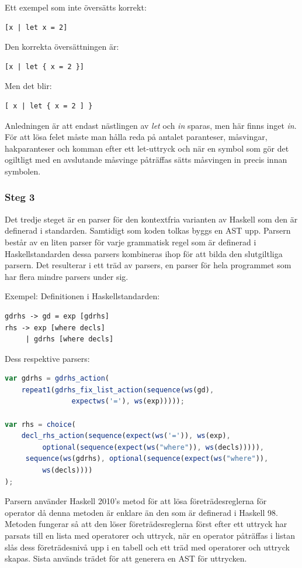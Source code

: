 Ett exempel som inte översätts korrekt:
\begin{lstlisting}
[x | let x = 2]
\end{lstlisting}
Den korrekta översättningen är:
\begin{lstlisting}
[x | let { x = 2 }]
\end{lstlisting}
Men det blir:
\begin{lstlisting}
[ x | let { x = 2 ] }
\end{lstlisting}
Anledningen är att endast nästlingen av \emph{let} och \emph{in} sparas, men här finns inget \emph{in}.
För att lösa felet måste man hålla reda på antalet paranteser, måsvingar, hakparanteser och komman efter ett let-uttryck och när en symbol som gör det ogiltligt 
med en avslutande måsvinge påträffas sätts måsvingen in precis innan symbolen.

\subsubsection{Steg 3}
Det tredje steget är en parser för den kontextfria varianten av Haskell som den är definerad i standarden. 
Samtidigt som koden tolkas byggs en AST upp. Parsern består av en liten parser för varje grammatisk regel som är definerad i Haskellstandarden 
dessa parsers kombineras ihop för att bilda den slutgiltliga parsern. Det resulterar i ett träd av parsers, en parser för hela programmet som har flera mindre parsers under sig.

Exempel:
Definitionen i Haskellstandarden:
\begin{lstlisting}
gdrhs -> gd = exp [gdrhs]
rhs -> exp [where decls]
     | gdrhs [where decls]
\end{lstlisting}
Dess respektive parsers:
\begin{lstlisting}[language=javascript]
var gdrhs = gdrhs_action(
    repeat1(gdrhs_fix_list_action(sequence(ws(gd), 
                expectws('='), ws(exp)))));

var rhs = choice(
    decl_rhs_action(sequence(expect(ws('=')), ws(exp), 
         optional(sequence(expect(ws("where")), ws(decls))))),
     sequence(ws(gdrhs), optional(sequence(expect(ws("where")), 
         ws(decls))))
);
\end{lstlisting}

Parsern använder Haskell 2010's \citep{haskell2010} metod för att lösa företrädesreglerna för operator då denna metoden är enklare än den som är definerad i Haskell 98. 
Metoden fungerar så att den löser företrädesreglerna först efter ett uttryck har parsats till en lista med operatorer 
och uttryck, när en operator påträffas i listan slås dess företrädesnivå upp i en tabell och ett träd med 
operatorer och uttryck skapas. Sista används trädet för att generera en AST för uttrycken.


